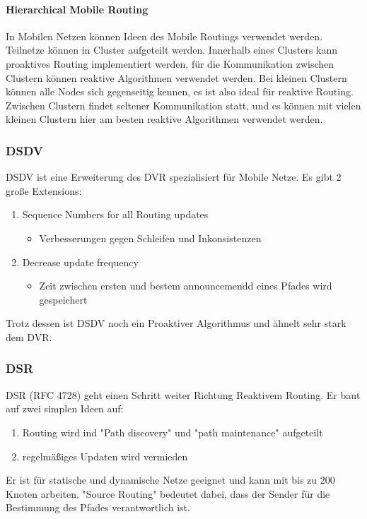 		\paragraph{Hierarchical Mobile Routing}
			In Mobilen Netzen können Ideen des Mobile Routings verwendet werden. Teilnetze können in Cluster aufgeteilt werden. Innerhalb eines Clusters kann proaktives Routing implementiert werden, für die Kommunikation zwischen Clustern können reaktive Algorithmen verwendet werden. Bei kleinen Clustern können alle Nodes sich gegenseitig kennen, es ist also ideal für reaktive Routing. Zwischen Clustern findet seltener Kommunikation statt, und es können mit vielen kleinen Clustern hier am besten reaktive Algorithmen verwendet werden.

		\subsubsection{DSDV}
			DSDV ist eine Erweiterung des DVR spezialisiert für Mobile Netze. Es gibt 2 große Extensions: 
			\begin{enumerate}
				\item Sequence Numbers for all Routing updates
				\begin{itemize}
					\item Verbesserungen gegen Schleifen und Inkonsistenzen
				\end{itemize}
				\item Decrease update frequency
				\begin{itemize}
					\item Zeit zwischen ersten und bestem announcemendd eines Pfades wird gespeichert
				\end{itemize}
			\end{enumerate}
			Trotz dessen ist DSDV noch ein Proaktiver Algorithmus und ähnelt sehr stark dem DVR. 

		\subsubsection{DSR}
			DSR (RFC 4728) geht einen Schritt weiter Richtung Reaktivem Routing. Er baut auf zwei simplen Ideen auf: 
			\begin{enumerate}
				\item Routing wird ind "Path discovery" und "path maintenance" aufgeteilt
				\item regelmäßiges Updaten wird vermieden
			\end{enumerate}
			Er ist für statische und dynamische Netze geeignet und kann mit bis zu 200 Knoten arbeiten. "Source Routing" bedeutet dabei, dass der Sender für die Bestimmung des Pfades verantwortlich ist.
